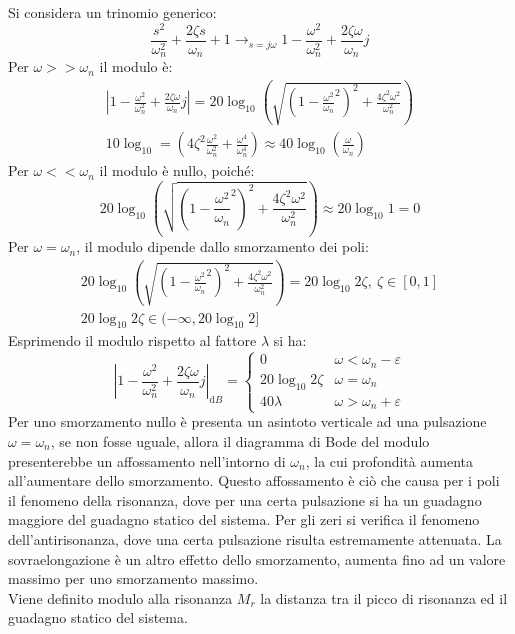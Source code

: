 \documentclass{article}
\numberwithin{equation}{subsection}
\newcommand{\df}{\mathrm{d}}
\begin{document}
Si considera un trinomio generico: 
\begin{equation*}
    \displaystyle\frac{s^2}{\omega_n^2}+\frac{2\zeta s}{\omega_n}+1\to_{s=j\omega}1-\frac{\omega^2}{\omega_n^2}+\frac{2\zeta\omega}{\omega_n}j
\end{equation*} 
Per $\omega>>\omega_n$ il modulo è: 
\begin{gather*}
    \left|1-\frac{\omega^2}{\omega_n^2}+\frac{2\zeta\omega}{\omega_n}j\right|=20\log_{10}\left(\sqrt{\left(1-\displaystyle\frac{\omega^2}{\omega_n}^2\right)^2+\frac{4\zeta^2\omega^2}{\omega_n^2}}\right)\\
    10\log_{10}=\left(4\zeta^2\displaystyle\frac{\omega^2}{\omega_n^2}+\frac{\omega^4}{\omega_n^4}\right)\approx40\log_{10}\left(\displaystyle\frac{\omega}{\omega_n}\right)
\end{gather*}
Per $\omega<<\omega_n$ il modulo è nullo, poiché: 
\begin{equation*}
    20\log_{10}\left(\sqrt{\left(1-\displaystyle\frac{\omega^2}{\omega_n}^2\right)^2+\frac{4\zeta^2\omega^2}{\omega_n^2}}\right)\approx20\log_{10}1=0
\end{equation*}
Per $\omega=\omega_n$, il modulo dipende dallo smorzamento dei poli:
\begin{gather*}
    20\log_{10}\left(\sqrt{\left(1-\displaystyle\frac{\omega^2}{\omega_n}^2\right)^2+\frac{4\zeta^2\omega^2}{\omega_n^2}}\right)=20\log_{10}2\zeta,\:\zeta\in[0,1]\\
    20\log_{10}2\zeta\in(-\infty,20\log_{10}2]
\end{gather*}
Esprimendo il modulo rispetto al fattore $\lambda$ si ha:
\begin{equation}
    \left|1\displaystyle-\frac{\omega^2}{\omega_n^2}+\frac{2\zeta\omega}{\omega_n}j\right|_{\df B}=\begin{cases}
        0&\omega<\omega_n-\varepsilon\\
        20\log_{10}2\zeta&\omega=\omega_n\\
        40\lambda&\omega>\omega_n+\varepsilon
    \end{cases}
\end{equation}
Per uno smorzamento nullo è presenta un asintoto verticale ad una pulsazione $\omega=\omega_n$, se non fosse uguale, allora il diagramma di Bode del modulo presenterebbe 
un affossamento nell'intorno di $\omega_n$, la cui profondità aumenta all'aumentare dello smorzamento. Questo affossamento è ciò che causa per i poli il fenomeno della 
risonanza, dove per una certa pulsazione si ha un guadagno maggiore del guadagno statico del sistema. Per gli zeri si verifica il fenomeno dell'antirisonanza, dove 
una certa pulsazione risulta estremamente attenuata. La sovraelongazione è un altro effetto dello smorzamento, aumenta fino ad un valore massimo per uno smorzamento 
massimo. 
\\
Viene definito modulo alla risonanza $M_r$ la distanza tra il picco di risonanza ed il guadagno statico del sistema. 
\end{document}
